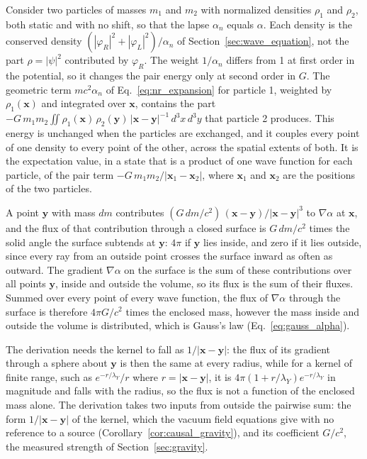 \documentclass[aps,prd,onecolumn,tightenlines,nofootinbib,notitlepage,11pt,floatfix]{revtex4-2}
\theoremstyle{indentedtheorem}
\begin{document}
Consider two particles of masses $m_1$ and $m_2$ with normalized densities $\rho_1$ and $\rho_2$, both static and with no shift, so that the lapse $\alpha_n$ equals $\alpha$. Each density is the conserved density $(|\varphi_R|^2+|\varphi_L|^2)/\alpha_n$ of Section~\ref{sec:wave_equation}, not the part $\rho=|\psi|^2$ contributed by $\varphi_R$. The weight $1/\alpha_n$ differs from 1 at first order in the potential, so it changes the pair energy only at second order in $G$. The geometric term $mc^2\alpha_n$ of Eq.~\eqref{eq:nr_expansion} for particle 1, weighted by $\rho_1(\mathbf{x})$ and integrated over $\mathbf{x}$, contains the part $-G\,m_1m_2\iint\rho_1(\mathbf{x})\,\rho_2(\mathbf{y})\,|\mathbf{x}-\mathbf{y}|^{-1}\,d^3x\,d^3y$ that particle 2 produces. This energy is unchanged when the particles are exchanged, and it couples every point of one density to every point of the other, across the spatial extents of both. It is the expectation value, in a state that is a product of one wave function for each particle, of the pair term $-G\,m_1m_2/|\mathbf{x}_1-\mathbf{x}_2|$, where $\mathbf{x}_1$ and $\mathbf{x}_2$ are the positions of the two particles.

A point $\mathbf{y}$ with mass $dm$ contributes $(G\,dm/c^2)\,(\mathbf{x}-\mathbf{y})/|\mathbf{x}-\mathbf{y}|^3$ to $\nabla\alpha$ at $\mathbf{x}$, and the flux of that contribution through a closed surface is $G\,dm/c^2$ times the solid angle the surface subtends at $\mathbf{y}$: $4\pi$ if $\mathbf{y}$ lies inside, and zero if it lies outside, since every ray from an outside point crosses the surface inward as often as outward. The gradient $\nabla\alpha$ on the surface is the sum of these contributions over all points $\mathbf{y}$, inside and outside the volume, so its flux is the sum of their fluxes. Summed over every point of every wave function, the flux of $\nabla\alpha$ through the surface is therefore $4\pi G/c^2$ times the enclosed mass, however the mass inside and outside the volume is distributed, which is Gauss's law (Eq.~\eqref{eq:gauss_alpha}).

The derivation needs the kernel to fall as $1/|\mathbf{x}-\mathbf{y}|$: the flux of its gradient through a sphere about $\mathbf{y}$ is then the same at every radius, while for a kernel of finite range, such as $e^{-r/\lambda_Y}/r$ where $r=|\mathbf{x}-\mathbf{y}|$, it is $4\pi(1+r/\lambda_Y)e^{-r/\lambda_Y}$ in magnitude and falls with the radius, so the flux is not a function of the enclosed mass alone. The derivation takes two inputs from outside the pairwise sum: the form $1/|\mathbf{x}-\mathbf{y}|$ of the kernel, which the vacuum field equations give with no reference to a source (Corollary~\ref{cor:causal_gravity}), and its coefficient $G/c^2$, the measured strength of Section~\ref{sec:gravity}.
\end{document}
